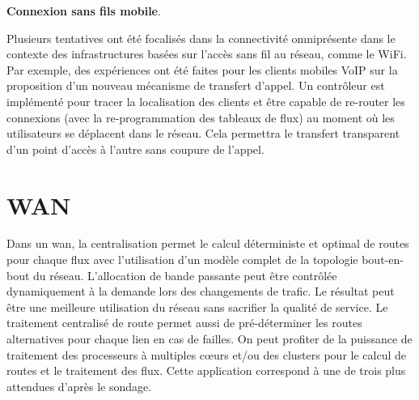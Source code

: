 
\textbf{Connexion sans fils mobile}.

Plusieurs tentatives ont été focalisés dans la connectivité omniprésente dans le contexte des infrastructures basées sur l'accès sans fil au réseau, comme le WiFi. Par exemple, des expériences ont été faites pour les clients mobiles VoIP sur la proposition d'un nouveau mécanisme de transfert d'appel. Un contrôleur est implémenté pour tracer la localisation des clients et être capable de re-router les connexions (avec la re-programmation des tableaux de flux) au moment où les utilisateurs se déplacent dans le réseau. Cela permettra le transfert transparent d'un point d'accès à l'autre sans coupure de l'appel. \cite{OpenFlowStanfordUsing}





\section{WAN}
Dans un \gls{wan}, la centralisation permet le calcul déterministe et optimal de routes pour chaque flux avec l'utilisation d'un modèle complet de la topologie bout-en-bout du réseau. L'allocation de bande passante peut être contrôlée dynamiquement à la demande lors des changements de trafic. Le résultat peut être une meilleure utilisation du réseau sans sacrifier la qualité de service. Le traitement centralisé de route permet aussi de pré-déterminer les routes alternatives pour chaque lien en cas de failles. On peut profiter de la puissance de traitement des processeurs à multiples cœurs et/ou des \glspl{cluster} pour le calcul de routes et le traitement des flux. Cette application correspond à une de trois plus attendues d'après le sondage. \cite{2013GuideSDNNVUseCases}



